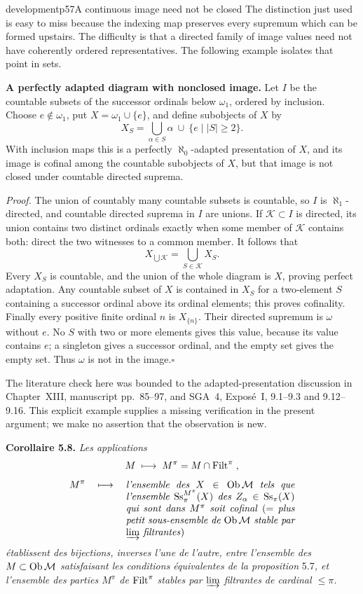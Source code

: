 \begin{dcomment}{development}{p57}{A continuous image need not be closed}
The distinction just used is easy to miss because the indexing map preserves every supremum which can be formed upstairs. The difficulty is that a directed family of image values need not have coherently ordered representatives. The following example isolates that point in sets.

\textbf{A perfectly adapted diagram with nonclosed image.}\ours
Let $I$ be the countable subsets of the successor ordinals below $\omega_1$, ordered by inclusion. Choose $e\notin\omega_1$, put $X=\omega_1\cup\{e\}$, and define subobjects of $X$ by
\[
 X_S=\bigcup_{\alpha\in S}\alpha
       \ \cup\ \{e\mid |S|\geq2\}.
\]
With inclusion maps this is a perfectly $\aleph_0$-adapted presentation of $X$, and its image is cofinal among the countable subobjects of $X$, but that image is not closed under countable directed suprema.

\emph{Proof.} The union of countably many countable subsets is countable, so $I$ is $\aleph_1$-directed, and countable directed suprema in $I$ are unions. If $\mathcal K\subset I$ is directed, its union contains two distinct ordinals exactly when some member of $\mathcal K$ contains both: direct the two witnesses to a common member. It follows that
\[
 X_{\bigcup\mathcal K}=\bigcup_{S\in\mathcal K}X_S.
\]
Every $X_S$ is countable, and the union of the whole diagram is $X$, proving perfect adaptation. Any countable subset of $X$ is contained in $X_S$ for a two-element $S$ containing a successor ordinal above its ordinal elements; this proves cofinality. Finally every positive finite ordinal $n$ is $X_{\{n\}}$. Their directed supremum is $\omega$ without $e$. No $S$ with two or more elements gives this value, because its value contains $e$; a singleton gives a successor ordinal, and the empty set gives the empty set. Thus $\omega$ is not in the image.\hfill$\square$

The literature check here was bounded to the adapted-presentation discussion in Chapter~XIII, manuscript pp.~85--97, and SGA~4, Expos\'e~I, 9.1--9.3 and 9.12--9.16. This explicit example supplies a missing verification in the present argument; we make no assertion that the observation is new.
\end{dcomment}


\textbf{Corollaire 5.8.} \textit{Les applications}
\[
M \;\longmapsto\; M^\pi = M \cap \mathrm{Filt}^\pi \;,
\]
\[
M^\pi \quad\longmapsto\quad \parbox[t]{0.5\textwidth}{\textit{l'ensemble des $X \in \Ob\M$ tels que l'ensemble $\Ss_\pi^{M^\pi}(X)$ des $Z_\alpha \in \Ss_\pi(X)$ qui sont dans $M^\pi$ soit cofinal} (= \textit{plus petit sous-ensemble de $\Ob\M$ stable par $\varinjlim$ filtrantes})}
\]
\textit{établissent des bijections, inverses l'une de l'autre, entre l'ensemble des $M \subset \operatorname{Ob}\mathcal{M}$ satisfaisant les conditions équivalentes de la proposition} 5.7\textit{, et l'ensemble des parties $M^\pi$ de} $\mathrm{Filt}^\pi$ \textit{stables par $\varinjlim$ filtrantes de cardinal $\leq \pi$.}

